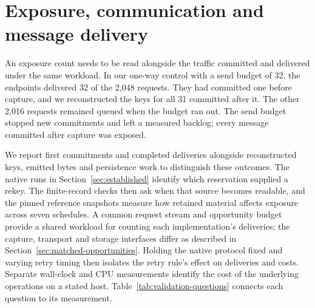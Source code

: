 \section{Exposure, communication and message delivery}
\label{sec:evaluation}

An exposure count needs to be read alongside the traffic committed and
delivered under the same workload. In our one-way control with a send
budget of 32, the endpoints delivered 32 of the 2,048 requests. They had committed
one before capture, and we reconstructed the keys for all 31 committed
after it. The other 2,016 requests remained queued when the budget ran
out. The send budget stopped new commitments and left a measured
backlog; every message committed after capture was exposed.

We report first commitments and completed deliveries alongside
reconstructed keys, emitted bytes and persistence work to distinguish
these outcomes. The native runs in Section~\ref{sec:established}
identify which reservation supplied a rekey. The finite-record checks
then ask when that source becomes readable, and the pinned reference
snapshots measure how retained material affects exposure across seven
schedules. A common request stream and opportunity budget provide a
shared workload for counting each implementation's deliveries;
the capture, transport and storage interfaces differ as described in
Section~\ref{sec:matched-opportunities}. Holding the native protocol fixed
and varying retry timing then isolates the retry rule's effect on
deliveries and costs.
Separate wall-clock and CPU measurements identify the cost of the
underlying operations on a stated host.
Table~\ref{tab:validation-questions} connects each question to its
measurement.

